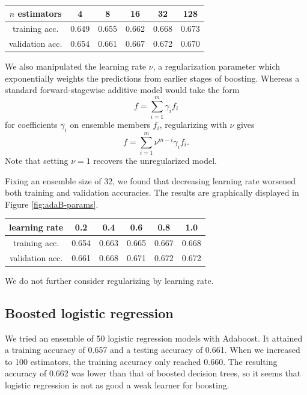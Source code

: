\documentclass{article}
\begin{document}
\begin{multicols}{2}
\begin{center}
    \begin{tabular}{c|ccccc}
        $n$ estimators &
          4 & 8 & 16 & 32 & 128 \\\hline
        training acc. &
          0.649 & 0.655 & 0.662 & 0.668 & 0.673\\
        validation acc. &
          0.654 & 0.661 & 0.667 & 0.672 &0.670
    \end{tabular}
\end{center}

We also manipulated the learning rate $\nu$,
a regularization parameter which exponentially weights the predictions
from earlier stages of boosting.
Whereas a standard forward-stagewise additive model
would take the form
\begin{equation}
    f = \sum_{i=1}^m \gamma_i f_i
\end{equation}
for coefficients $\gamma_i$ on ensemble members $f_i$,
regularizing with $\nu$ gives
\begin{equation}
    f = \sum_{i=1}^m \nu^{m - i}\gamma_i f_i.
\end{equation}
Note that setting $\nu = 1$ recovers the unregularized model.

Fixing an ensemble size of 32,
we found that decreasing learning rate worsened both training
and validation accuracies.
The results are graphically displayed in Figure \ref{fig:adaB-params}.

\begin{center}
    \begin{tabular}{c|ccccc}
        learning rate &
          0.2 & 0.4 & 0.6 & 0.8 & 1.0 \\\hline
        training acc. &
          0.654& 0.663& 0.665& 0.667& 0.668\\
        validation acc. &
          0.661& 0.668& 0.671& 0.672& 0.672
    \end{tabular}
\end{center}

We do not further consider regularizing by learning rate.

\subsection{Boosted logistic regression}

We tried an ensemble of 50 
logistic regression models with Adaboost.
It attained a training accuracy of 0.657
and a testing accuracy of 0.661.
When we increased to 100 estimators,
the training accuracy only reached 0.660.
The resulting accuracy of 0.662
was lower than that of boosted decision trees,
so it seems that
logistic regression is not as good a
weak learner for boosting.


\end{multicols}
\end{document}
